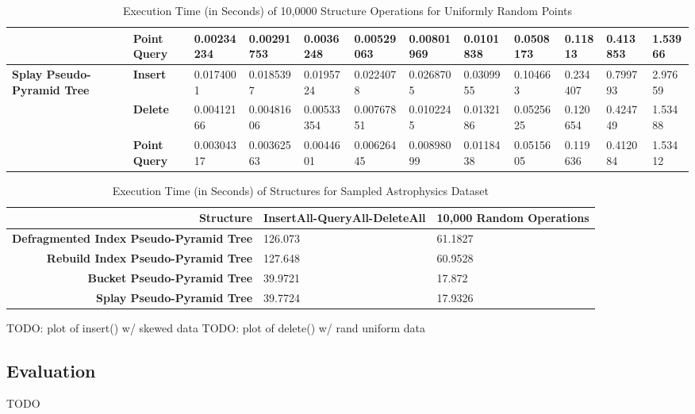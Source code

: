\begin{landscape}
\begin{table}
\begin{tabular}{|p{2cm}|l|l|l|l|l|l|l|l|l|l|l|}
			 & \textbf{Point Query} & 0.00234234 & 0.00291753 & 0.0036248 & 0.00529063 & 0.00801969 & 0.0101838 & 0.0508173 & 0.11813 & 0.413853 & 1.53966 \\
			\hline
			\multirow{ 4}{*}{\textbf{Splay Pseudo-Pyramid Tree}} & \textbf{Insert} & 0.0174001 & 0.0185397 & 0.0195724 & 0.0224078 & 0.0268705 & 0.0309955 & 0.104663 & 0.234407 & 0.799793 & 2.97659 \\
			 & \textbf{Delete} & 0.00412166 & 0.00481606 & 0.00533354 & 0.00767851 & 0.0102245 & 0.0132186 & 0.0525625 & 0.120654 & 0.424749 & 1.53488  \\
			 & \textbf{Point Query} & 0.00304317 & 0.00362563 & 0.0044601 & 0.00626445 & 0.00898099 & 0.0118438 & 0.0515605 & 0.119636 & 0.412084 & 1.53412 \\
			\hline
		\end{tabular}
		\caption{Execution Time (in Seconds) of 10,0000 Structure Operations for Uniformly Random Points}
		\label{tab:perf2-randuniform}
	\end{table}

	\begin{table}
		\centering
		\begin{tabular}{|r|l|l|}
			\hline
			\textbf{Structure} & \textbf{InsertAll-QueryAll-DeleteAll} & \textbf{10,000 Random Operations} \\
			\hline
			\textbf{Defragmented Index Pseudo-Pyramid Tree} & 126.073 & 61.1827 \\
			\textbf{Rebuild Index Pseudo-Pyramid Tree} & 127.648 & 60.9528 \\
			\textbf{Bucket Pseudo-Pyramid Tree} & 39.9721 & 17.872 \\
			\textbf{Splay Pseudo-Pyramid Tree} & 39.7724 & 17.9326 \\
			\hline
		\end{tabular}
		\caption{Execution Time (in Seconds) of Structures for Sampled Astrophysics Dataset}
		\label{tab:perf2-astrophysics}
	\end{table}

\end{landscape}

TODO: plot of insert() w/ skewed data
TODO: plot of delete() w/ rand uniform data

\subsection{Evaluation}

TODO
